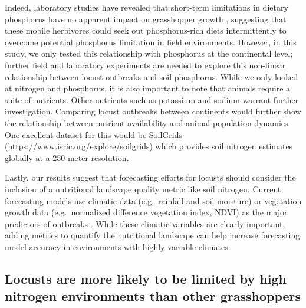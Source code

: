 \documentclass[
]{article}
\begin{document}
Indeed, laboratory studies have revealed that short-term limitations in
dietary phosphorus have no apparent impact on grasshopper growth
\citep{cease_dietary_2016}, suggesting that these mobile herbivores
could seek out phosphorus-rich diets intermittently to overcome
potential phosphorus limitation in field environments. However, in this
study, we only tested this relationship with phosphorus at the
continental level; further field and laboratory experiments are needed
to explore this non-linear relationship between locust outbreaks and
soil phosphorus. While we only looked at nitrogen and phosphorus, it is
also important to note that animals require a suite of nutrients. Other
nutrients such as potassium and sodium \citep{joern_not_2012} warrant
further investigation. Comparing locust outbreaks between continents
would further show the relationship between nutrient availability and
animal population dynamics. One excellent dataset for this would be
SoilGrids (https://www.isric.org/explore/soilgrids) which provides soil
nitrogen estimates globally at a 250-meter resolution.

Lastly, our results suggest that forecasting efforts for locusts should
consider the inclusion of a nutritional landscape quality metric like
soil nitrogen. Current forecasting models use climatic data
(e.g.~rainfall and soil moisture) or vegetation growth data
(e.g.~normalized difference vegetation index, NDVI) as the major
predictors of outbreaks \citep{cressman_role_2013}. While these climatic
variables are clearly important, adding metrics to quantify the
nutritional landscape can help increase forecasting model accuracy in
environments with highly variable climates.

\subsection{Locusts are more likely to be limited by high nitrogen
environments than other
grasshoppers}\label{locusts-are-more-likely-to-be-limited-by-high-nitrogen-environments-than-other-grasshoppers}
\end{document}
